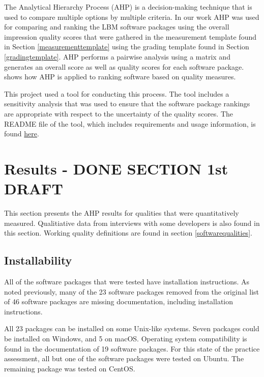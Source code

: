 \documentclass[12pt, notitlepage]{article}
\begin{document}
The Analytical Hierarchy Process (AHP) is a decision-making technique that is used to compare multiple options by multiple criteria. In our work AHP was used for comparing and ranking the LBM software packages using the overall impression quality scores that were gathered in the measurement template found in Section \ref{measurementtemplate} using the grading template found in Section \ref{gradingtemplate}. AHP performs a pairwise analysis using a matrix and generates an overall score as well as quality scores for each software package. \cite{SmithEtAl2016} shows how AHP is applied to ranking software based on quality measures. 

This project used a tool for conducting this process. The tool includes a sensitivity analysis that was used to ensure that the software package rankings are appropriate with respect to the uncertainty of the quality scores. The README file of the tool, which includes requirements and usage information, is found \href{https://github.com/smiths/AIMSS/blob/master/StateOfPractice/AHP2020/LBM/README.txt}{here}. 

\newpage
\section{Results - DONE SECTION 1st DRAFT}\label{qualityresults}

This section presents the AHP results for qualities that were quantitatively measured. Qualitiative data from interviews with some developers is also found in this section. Working quality definitions are found in section \ref{softwarequalities}.

\subsection{Installability}

All of the software packages that were tested have installation instructions. As noted previously, many of the 23 software packages removed from the original list of 46 software packages are missing documentation, including installation instructions. 

All 23 packages can be installed on some Unix-like systems. Seven packages could be installed on Windows, and 5 on macOS. Operating system compatibility is found in the documentation of 19 software packages. For this state of the practice assessment, all but one of the software packages were tested on Ubuntu. The remaining package was tested on CentOS.
\end{document}

